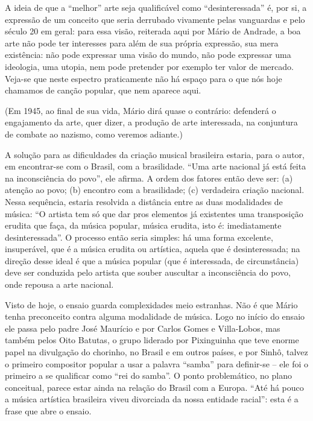 A ideia de que a ``melhor'' arte seja qualificável como
``desinteressada'' é, por si, a expressão de um conceito que seria
derrubado vivamente pelas vanguardas e pelo século 20 em geral: para
essa visão, reiterada aqui por Mário de Andrade, a boa arte não pode ter
interesses para além de sua própria expressão, sua mera existência: não
pode expressar uma visão do mundo, não pode expressar uma ideologia, uma
utopia, nem pode pretender por exemplo ter valor de mercado. Veja-se que
neste espectro praticamente não há espaço para o que nós hoje chamamos
de canção popular, que nem aparece aqui.

(Em 1945, ao final de sua vida, Mário dirá quase o contrário: defenderá
o engajamento da arte, quer dizer, a produção de arte interessada, na
conjuntura de combate ao nazismo, como veremos adiante.)

A solução para as dificuldades da criação musical brasileira estaria,
para o autor, em encontrar-se com o Brasil, com a brasilidade. ``Uma
arte nacional já está feita na inconsciência do povo'', ele afirma. A
ordem dos fatores então deve ser: (a) atenção ao povo; (b) encontro com
a brasilidade; (c) verdadeira criação nacional. Nessa sequência, estaria
resolvida a distância entre as duas modalidades de música: ``O artista
tem só que dar pros elementos já existentes uma transposição erudita que
faça, da música popular, música erudita, isto é: imediatamente
desinteressada''. O processo então seria simples: há uma forma
excelente, insuperável, que é a música erudita ou artística, aquela que
é desinteressada; na direção desse ideal é que a música popular (que é
interessada, de circunstância) deve ser conduzida pelo artista que
souber auscultar a inconsciência do povo, onde repousa a arte nacional.

Visto de hoje, o ensaio guarda complexidades meio estranhas. Não é que
Mário tenha preconceito contra alguma modalidade de música. Logo no
início do ensaio ele passa pelo padre José Maurício e por Carlos Gomes e
Villa-Lobos, mas também pelos Oito Batutas, o grupo liderado por
Pixinguinha que teve enorme papel na divulgação do chorinho, no Brasil e
em outros países, e por Sinhô, talvez o primeiro compositor popular a
usar a palavra ``samba'' para definir-se -- ele foi o primeiro a se
qualificar como ``rei do samba''. O ponto problemático, no plano
conceitual, parece estar ainda na relação do Brasil com a Europa. ``Até
há pouco a música artística brasileira viveu divorciada da nossa
entidade racial'': esta é a frase que abre o ensaio.

